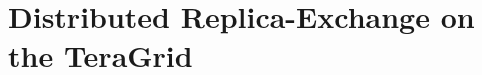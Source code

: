 \documentclass{rspublic}
\newcommand{\replicaagent}[1]{Replica-Agent }
\begin{document}
% 
% 
% 
% 




\section{Distributed Replica-Exchange on the TeraGrid}
\label{sec:exp}
        
\end{document}
